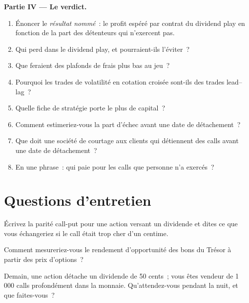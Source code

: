 \begin{problem}
\medskip\noindent\textbf{Partie IV --- Le verdict.}
\begin{enumerate}[resume]
\item Énoncer le \emph{résultat nommé}~: le profit espéré par contrat du dividend play en fonction de la part des détenteurs qui n'exercent pas.
\item Qui perd dans le dividend play, et pourraient-ils l'éviter~?
\item Que feraient des plafonds de frais plus bas au jeu~?
\item Pourquoi les trades de volatilité en cotation croisée sont-ils des trades lead--lag~?
\item Quelle fiche de stratégie porte le plus de capital~?
\item Comment estimeriez-vous la part d'échec avant une date de détachement~?
\item Que doit une société de courtage aux clients qui détiennent des calls avant une date de détachement~?
\item En une phrase~: qui paie pour les calls que personne n'a exercés~?
\end{enumerate}
\end{problem}

\section{Questions d'entretien}

\begin{interviewq}\label{iq:hf:options-cross-venue-and-volatility-arbitrage-at-speed:1}
Écrivez la parité call-put pour une action versant un dividende et dites ce que vous échangeriez si le call était trop cher d'un centime.
\end{interviewq}

\begin{interviewq}\label{iq:hf:options-cross-venue-and-volatility-arbitrage-at-speed:2}
Comment mesureriez-vous le rendement d'opportunité des bons du Trésor à partir des prix d'options~?
\end{interviewq}

\begin{interviewq}\label{iq:hf:options-cross-venue-and-volatility-arbitrage-at-speed:3}
Demain, une action détache un dividende de 50 cents~; vous êtes vendeur de 1\,000 calls profondément dans la monnaie. Qu'attendez-vous pendant la nuit, et que faites-vous~?
\end{interviewq}

